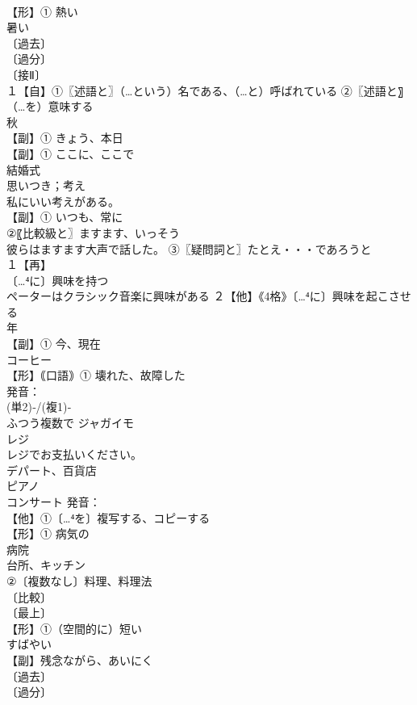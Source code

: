 \documentclass[8pt]{extreport}
\begin{document}
\begin{CJK}{UTF8}{min}
\\	【形】① 熱い
\\	暑い
\\	〔過去〕
\\	〔過分〕
\\	〔接Ⅱ〕
\\	１【自】①〖述語と〗（…という）名である、（…と）呼ばれている ②〖述語と〗（…を）意味する 
\\	秋
\\	【副】① きょう、本日 
\\	【副】① ここに、ここで
\\	結婚式 
\\	思いつき；考え
\\	私にいい考えがある。
\\	【副】① いつも、常に
\\	②〖比較級と〗ますます、いっそう 
\\	彼らはますます大声で話した。 ③〖疑問詞と〗たとえ・・・であろうと 
\\	１【再】
\\	〔…⁴に〕興味を持つ 
\\	ペーターはクラシック音楽に興味がある ２【他】《4格》〔…⁴に〕興味を起こさせる
\\	年 
\\	【副】① 今、現在 
\\	コーヒー 
\\	【形】｟口語｠① 壊れた、故障した
\\	発音：
\\	(単2)‐/(複1)‐
\\	ふつう複数で ジャガイモ
\\	レジ 
\\	レジでお支払いください。
\\	デパート、百貨店
\\	ピアノ
\\	コンサート 発音：
\\	【他】①〔…⁴を〕複写する、コピーする 
\\	【形】① 病気の
\\	病院 
\\	台所、キッチン
\\	②〔複数なし〕料理、料理法
\\	〔比較〕
\\	〔最上〕
\\	【形】①（空間的に）短い 
\\	すばやい
\\	【副】残念ながら、あいにく
\\	〔過去〕
\\	〔過分〕

\end{CJK}
\end{document}
